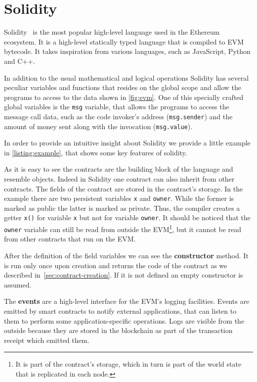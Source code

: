 \section{Solidity}
Solidity~\cite{bib:solidity-docs} is the most popular
high-level language used in the Ethereum ecosystem.
It is a high-level statically typed language that is compiled to EVM bytecode.
It takes inspiration from various languages, such as JavaScript, Python and C++.

In addition to the usual mathematical and logical operations Solidity has
several peculiar variables and functions that resides on the global scope and
allow the programs to access to the data shown in \autoref{fig:evm}. 
One of this specially crafted global variables is the \texttt{msg} variable,
that allows the programs to access the message call data,
such as the code invoker's address (\texttt{msg.sender}) and the amount of 
money sent along with the invocation (\texttt{msg.value}).

In order to provide an intuitive insight about Solidity we provide a little
example in \autoref{listing:example}, that shows some key features of solidity.

\begin{figure}

\end{figure}

As it is easy to see the contracts are the building block of the language and
resemble objects. Indeed in Solidity one contract can also inherit from other
contracts.
The fields of the contract are stored in the contract's storage. In the example
there are two persistent variables \verb|x| and \verb|owner|. While the former
is marked as public the latter is marked as private. Thus, the compiler
creates a getter \verb|x()| for variable \verb|x| but not for variable 
\verb|owner|. It should be noticed that the \verb|owner| variable can still
be read from outside the EVM\footnote{It is part of the contract's storage,
which in turn is part of the world state that is replicated in each node.}, 
but it cannot be read from other contracts that run on the EVM.


After the definition of the field variables we can see the \textbf{constructor}
method. It is run only once upon creation and returns the code of the contract
as we described in~\autoref{sec:contract-creation}. If it is not defined
an empty constructor is assumed.

The \textbf{events} are a high-level interface for the EVM's logging 
facilities. Events are emitted by smart contracts to notify external 
applications, that can listen to them to perform some application-specific
operations. Logs are visible from the outside because they are stored
in the blockchain as part of the transaction receipt which emitted them.

